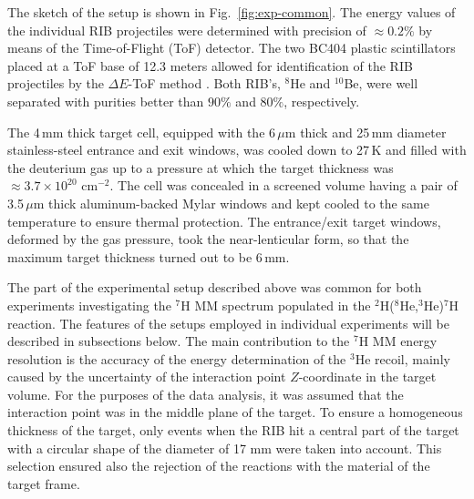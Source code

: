 The sketch of the setup is shown in Fig.\ \ref{fig:exp-common}.
The energy values of the individual RIB projectiles were determined with precision of $ \approx 0.2 \%$ by means of the Time-of-Flight (ToF) detector. 
The two BC404 plastic scintillators placed at a ToF base of 12.3 meters allowed for identification of the RIB projectiles by the $\Delta E$-ToF method \cite{Kaminski:2020}.
Both RIB's, $^8$He and $^{10}$Be, were well separated with purities better than $90\%$ and $80\%$, respectively.

The 4\,mm thick target cell, equipped with the 6\,$\mu$m thick and 25\,mm diameter stainless-steel entrance and exit windows, was cooled down to 27\,K and filled with the deuterium gas up to a pressure at which the target thickness was $\approx 3.7 \times 10 ^{20}$ cm$^{-2}$.
The cell was concealed in a screened volume having a pair of 3.5\,$\mu$m thick aluminum-backed Mylar windows and kept cooled to the same temperature to ensure thermal protection.
The entrance/exit target windows, deformed by the gas pressure, took the near-lenticular form, so that the maximum target thickness turned out to be 6\,mm.

The part of the experimental setup described above was common for both experiments investigating the $^7$H MM spectrum populated in the  $^2$H($^8$He,$^3$He)$^7$H reaction.
The features of the setups employed in individual experiments will be described in subsections below.
The main contribution to the $^{7}$H MM energy resolution is the accuracy of the energy determination of the $^3$He recoil, mainly caused by the uncertainty of the interaction point $Z$-coordinate in the target volume.
For the purposes of the data analysis, it was assumed that the interaction point was in the middle plane of the target.
To ensure a homogeneous thickness of the target, only events when the RIB hit a central part of the target with a circular shape of the diameter of 17 mm were taken into account.
This selection ensured also the rejection of the reactions with the material of the target frame.
